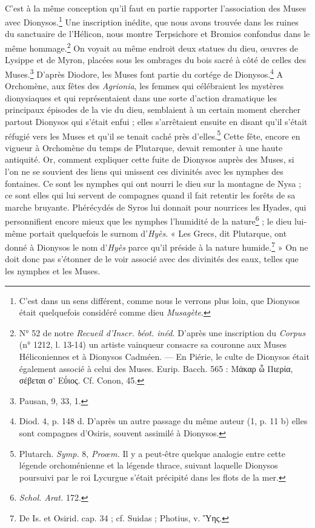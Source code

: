 \documentclass[a4paper, 11pt, oneside, polutonikogreek, french]{article}
\begin{document}
\paragraph{}
C'est à la même conception qu'il faut en partie rapporter l'association des Muses avec Dionysos.\footnote{C'est dans un sens différent, comme nous le verrons plus loin, que Dionysos était quelquefois considéré comme dieu \emph{Musagète}.} Une inscription inédite, que nous avons trouvée dans les ruines du sanctuaire de l'Hélicon, nous montre Terpsichore et Bromios confondus dans le même hommage.\footnote{N° 52 de notre \emph{Recueil d'Inscr. béot. inéd.} D'après une inscription du \emph{Corpus} (n° 1212, l. 13-14) un artiste vainqueur consacre sa couronne aux Muses Héliconiennes et à Dionysos Cadméen. --- En Piérie, le culte de Dionysos était également associé à celui des Muses. Eurip. Bacch. 565 : Μάκαρ ὦ Πιερία, σέβεται σ' Εΰιος. Cf. Conon, 45.} On voyait au même endroit deux statues du dieu, œuvres de Lysippe et de Myron, placées sous les ombrages du bois sacré à côté de celles des Muses.\footnote{Pausan, 9, 33, 1.} D'après Diodore, les Muses font partie du cortége de Dionysos.\footnote{Diod. 4, p. 148 d. D'après un autre passage du même auteur (1, p. 11 b) elles sont compagnes d'Osiris, souvent assimilé à Dionysos.} A Orchomène, aux fêtes des \emph{Agrionia}, les femmes qui célébraient les mystères dionysiaques et qui représentaient dans une sorte d'action dramatique les principaux épisodes de la vie du dieu, semblaient à un certain moment chercher partout Dionysos qui s'était enfui ; elles s'arrêtaient ensuite en disant qu'il s'était réfugié vers les Muses et qu'il se tenait caché près d'elles.\footnote{Plutarch. \emph{Symp.} 8, \emph{Proœm.} Il y a peut-être quelque analogie entre cette légende orchoménienne et la légende thrace, suivant laquelle Dionysos poursuivi par le roi Lycurgue s'était précipité dans les flots de la mer.} Cette fête, encore en vigueur à Orchomène du temps de Plutarque, devait remonter à une haute antiquité. Or, comment expliquer cette fuite de Dionysos auprès des Muses, si l'on ne se souvient des liens qui unissent ces divinités avec les nymphes des fontaines. Ce sont les nymphes qui ont nourri le dieu sur la montagne de Nysa ; ce sont elles qui lui servent de compagnes quand il fait retentir les forêts de sa marche bruyante. Phérécydés de Syros lui donnait pour nourrices les Hyades, qui personnifient encore mieux que les nymphes l'humidité de la nature\footnote{\emph{Schol. Arat.} 172.} ; le dieu lui-même portait quelquefois le surnom d'\emph{Hyès}. « Les Grecs, dit Plutarque, ont donné à Dionysos le nom d'\emph{Hyès} parce qu'il préside à la nature humide.\footnote{De Is. et Osirid. cap. 34 ; cf. Suidas ; Photius, v. Ὕης.} » On ne doit donc pas s'étonner de le voir associé avec des divinités des eaux, telles que les nymphes et les Muses.
\end{document}
